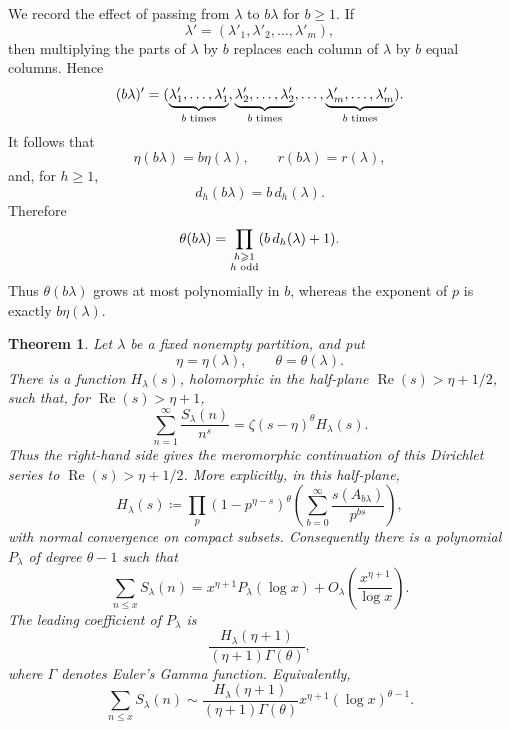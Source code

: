 \documentclass[a4paper,11pt,reqno]{amsart}
\theoremstyle{plain}
\newtheorem{theorem}{Theorem}[section]
\theoremstyle{remark}
\numberwithin{equation}{section}
\renewcommand{\leq}{\leqslant}
\renewcommand{\geq}{\geqslant}
\begin{document}
We record the effect of passing from $\lambda$ to $b\lambda$ for $b\geq 1$. If
\[
        \lambda'=(\lambda'_1,\lambda'_2,\ldots,\lambda'_m),
\]
then multiplying the parts of $\lambda$ by $b$ replaces each column of
$\lambda$ by $b$ equal columns. Hence
\[
        (b\lambda)'
        =
        (\underbrace{\lambda'_1,\ldots,\lambda'_1}_{b\textnormal{ times}},
         \underbrace{\lambda'_2,\ldots,\lambda'_2}_{b\textnormal{ times}},
         \ldots,
         \underbrace{\lambda'_m,\ldots,\lambda'_m}_{b\textnormal{ times}}).
\]
It follows that
\[
        \eta(b\lambda)=b\eta(\lambda),
        \qquad
        r(b\lambda)=r(\lambda),
\]
and, for $h\geq 1$,
\[
        d_h(b\lambda)=b\,d_h(\lambda).
\]
Therefore
\[
        \theta(b\lambda)=
        \prod_{\substack{h\geq 1\\ h\textnormal{ odd}}}
        (b\,d_h(\lambda)+1).
\]
Thus $\theta(b\lambda)$ grows at most polynomially in $b$, whereas the exponent
of $p$ is exactly $b\eta(\lambda)$.

\begin{theorem}\label{thm:fixed-shape}
Let $\lambda$ be a fixed nonempty partition, and put
\[
        \eta=\eta(\lambda),
        \qquad
        \theta=\theta(\lambda).
\]
There is a function $H_\lambda(s)$, holomorphic in the half-plane
$\operatorname{Re}(s)>\eta+1/2$, such that, for $\operatorname{Re}(s)>\eta+1$,
\[
        \sum_{n=1}^{\infty}\frac{S_\lambda(n)}{n^s}
        =
        \zeta(s-\eta)^\theta H_\lambda(s).
\]
Thus the right-hand side gives the meromorphic continuation of this Dirichlet
series to $\operatorname{Re}(s)>\eta+1/2$.
More explicitly, in this half-plane,
\[
        H_\lambda(s)\coloneqq
        \prod_p
        (1-p^{\eta-s})^\theta
        \left(\sum_{b=0}^{\infty}\frac{s(A_{b\lambda})}{p^{bs}}\right),
\]
with normal convergence on compact subsets.
Consequently there is a polynomial $P_\lambda$ of degree $\theta-1$ such
that
\[
        \sum_{n\leq x}S_\lambda(n)
        =
        x^{\eta+1}P_\lambda(\log x)
        +
        O_\lambda\left(\frac{x^{\eta+1}}{\log x}\right).
\]
The leading coefficient of $P_\lambda$ is
\[
        \frac{H_\lambda(\eta+1)}{(\eta+1)\Gamma(\theta)},
\]
where $\Gamma$ denotes Euler's Gamma function.
Equivalently,
\[
        \sum_{n\leq x}S_\lambda(n)
        \sim
        \frac{H_\lambda(\eta+1)}{(\eta+1)\Gamma(\theta)}
        x^{\eta+1}(\log x)^{\theta-1}.
\]
\end{theorem}
\end{document}
